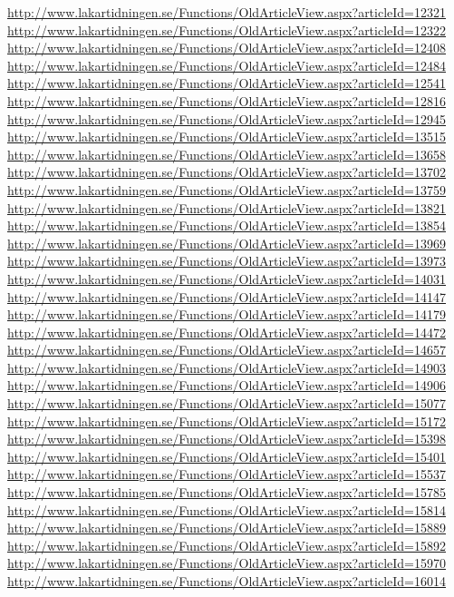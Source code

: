 \documentclass[a4paper]{report}
\begin{document}
\begin{appendices}
\begin{footnotesize}
\url{http://www.lakartidningen.se/Functions/OldArticleView.aspx?articleId=12321}
\url{http://www.lakartidningen.se/Functions/OldArticleView.aspx?articleId=12322}
\url{http://www.lakartidningen.se/Functions/OldArticleView.aspx?articleId=12408}
\url{http://www.lakartidningen.se/Functions/OldArticleView.aspx?articleId=12484}
\url{http://www.lakartidningen.se/Functions/OldArticleView.aspx?articleId=12541}
\url{http://www.lakartidningen.se/Functions/OldArticleView.aspx?articleId=12816}
\url{http://www.lakartidningen.se/Functions/OldArticleView.aspx?articleId=12945}
\url{http://www.lakartidningen.se/Functions/OldArticleView.aspx?articleId=13515}
\url{http://www.lakartidningen.se/Functions/OldArticleView.aspx?articleId=13658}
\url{http://www.lakartidningen.se/Functions/OldArticleView.aspx?articleId=13702}
\url{http://www.lakartidningen.se/Functions/OldArticleView.aspx?articleId=13759}
\url{http://www.lakartidningen.se/Functions/OldArticleView.aspx?articleId=13821}
\url{http://www.lakartidningen.se/Functions/OldArticleView.aspx?articleId=13854}
\url{http://www.lakartidningen.se/Functions/OldArticleView.aspx?articleId=13969}
\url{http://www.lakartidningen.se/Functions/OldArticleView.aspx?articleId=13973}
\url{http://www.lakartidningen.se/Functions/OldArticleView.aspx?articleId=14031}
\url{http://www.lakartidningen.se/Functions/OldArticleView.aspx?articleId=14147}
\url{http://www.lakartidningen.se/Functions/OldArticleView.aspx?articleId=14179}
\url{http://www.lakartidningen.se/Functions/OldArticleView.aspx?articleId=14472}
\url{http://www.lakartidningen.se/Functions/OldArticleView.aspx?articleId=14657}
\url{http://www.lakartidningen.se/Functions/OldArticleView.aspx?articleId=14903}
\url{http://www.lakartidningen.se/Functions/OldArticleView.aspx?articleId=14906}
\url{http://www.lakartidningen.se/Functions/OldArticleView.aspx?articleId=15077}
\url{http://www.lakartidningen.se/Functions/OldArticleView.aspx?articleId=15172}
\url{http://www.lakartidningen.se/Functions/OldArticleView.aspx?articleId=15398}
\url{http://www.lakartidningen.se/Functions/OldArticleView.aspx?articleId=15401}
\url{http://www.lakartidningen.se/Functions/OldArticleView.aspx?articleId=15537}
\url{http://www.lakartidningen.se/Functions/OldArticleView.aspx?articleId=15785}
\url{http://www.lakartidningen.se/Functions/OldArticleView.aspx?articleId=15814}
\url{http://www.lakartidningen.se/Functions/OldArticleView.aspx?articleId=15889}
\url{http://www.lakartidningen.se/Functions/OldArticleView.aspx?articleId=15892}
\url{http://www.lakartidningen.se/Functions/OldArticleView.aspx?articleId=15970}
\url{http://www.lakartidningen.se/Functions/OldArticleView.aspx?articleId=16014}

\end{footnotesize}
\end{appendices}
\end{document}
